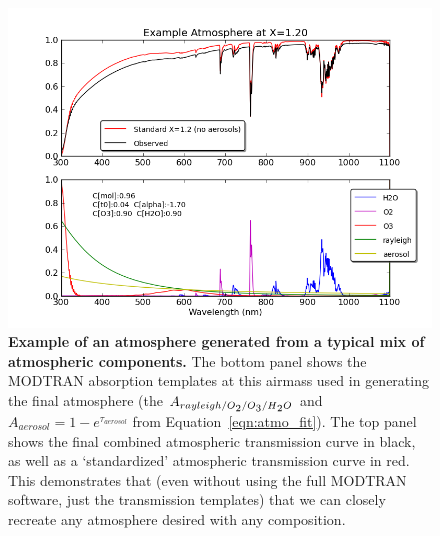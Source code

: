 \documentclass[12pt,preprint]{aastex}
\newcommand{\water}   {H\textsubscript{2}O}
\newcommand{\ozone}    {O\textsubscript{3}}
\newcommand{\oxy}     {O\textsubscript{2}}
\begin{document}
\label{sec:fit_atmo}

\begin{figure}[htb]
\centering
\includegraphics[width=6in]{atmo_airmass12}
\caption{{\small
{\bf Example of an atmosphere generated from a typical mix of
atmospheric components.} The bottom panel shows the MODTRAN absorption
templates at this airmass used in generating the final atmosphere
(the $A_{rayleigh/\oxy/\ozone/\water}$ and $A_{aerosol} = 1-e^{\tau_{aerosol}}$ from
Equation~\ref{eqn:atmo_fit}). The top panel shows the final combined atmospheric
transmission curve in black, as well as a `standardized' atmospheric transmission
curve in red. This demonstrates that (even without using the full
MODTRAN software, just the transmission templates) that we can closely
recreate any atmosphere desired with any composition.} }
\label{fig:absorption_comps2}
\end{figure}
\end{document}
